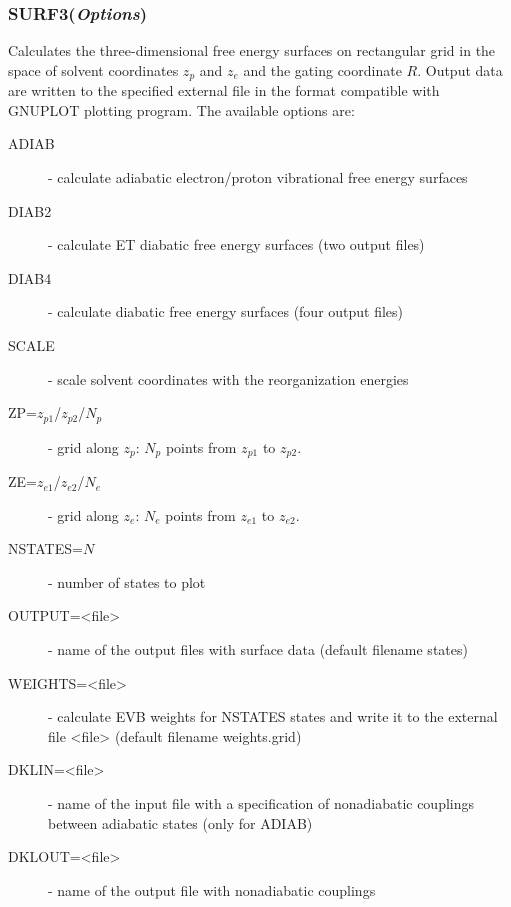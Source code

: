 \documentclass[oneside,11pt,openany]{book}
\newcommand{\tw}{\ttfamily}
\begin{document}
\subsubsection*{SURF3({\it Options})}
%
Calculates the three-dimensional free energy surfaces
on rectangular grid in the space of solvent coordinates
$z_p$ and $z_e$ and the gating coordinate $R$.
Output data are written to the specified external
file in the format compatible with GNUPLOT plotting
program. The available options are:
%
\begin{description}

\item[{\tw ADIAB}] - calculate adiabatic electron/proton vibrational
                     free energy surfaces

\item[{\tw DIAB2}] - calculate ET diabatic free energy surfaces
                     (two output files)

\item[{\tw DIAB4}] - calculate diabatic free energy surfaces
                     (four output files)

\item[{\tw SCALE}] - scale solvent coordinates with the reorganization
                     energies

\item[{\tw ZP=$z_{p1}$/$z_{p2}$/$N_p$}] - grid along $z_p$:
                                           $N_p$ points from $z_{p1}$
                                           to $z_{p2}$.

\item[{\tw ZE=$z_{e1}$/$z_{e2}$/$N_e$}] - grid along $z_e$:
                                           $N_e$ points from $z_{e1}$
                                           to $z_{e2}$.

\item[{\tw NSTATES=$N$}] - number of states to plot

\item[{\tw OUTPUT=<file>}] - name of the output files with surface data
                             (default filename {\tw states})

\item[{\tw WEIGHTS=<file>}] - calculate EVB weights for {\tw NSTATES} states
                              and write it to the external file {\tw <file>}
                              (default filename {\tw weights.grid})

\item[{\tw DKLIN=<file>}] - name of the input file with a specification
                            of nonadiabatic couplings between adiabatic
                            states (only for ADIAB)

\item[{\tw DKLOUT=<file>}] - name of the output file with nonadiabatic
                             couplings
\end{description}
\end{document}

